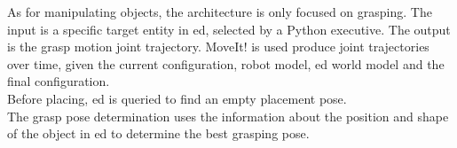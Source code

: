 As for manipulating objects, the architecture is only focused on grasping. 
The input is a specific target entity in \acrshort{ed}, selected by a Python executive. 
The output is the grasp motion joint trajectory. 
MoveIt! is used produce joint trajectories over time, given the current configuration, robot model, \acrshort{ed} world model and the final configuration. 
\\
Before placing, \acrshort{ed} is queried to find an empty placement pose.
\\
The grasp pose determination uses the information about the position and shape of the object in \acrshort{ed} to determine the best grasping pose. 
